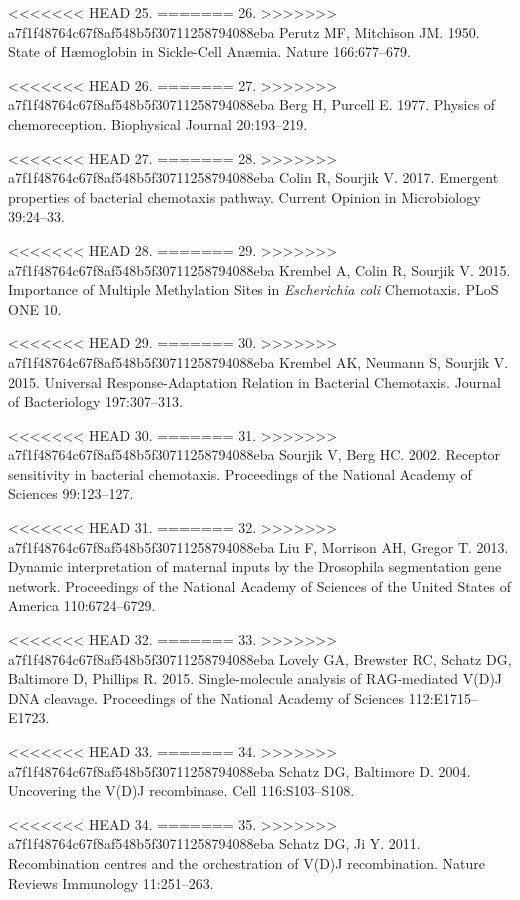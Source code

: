 \hypertarget{ref-perutz1950}{}
<<<<<<< HEAD
25.
=======
26.
>>>>>>> a7f1f48764c67f8af548b5f30711258794088eba
Perutz
MF,
Mitchison
JM.
1950.
State
of
Hæmoglobin
in
Sickle-Cell
Anæmia.
Nature
166:677--679.

\hypertarget{ref-berg1977}{}
<<<<<<< HEAD
26.
=======
27.
>>>>>>> a7f1f48764c67f8af548b5f30711258794088eba
Berg
H,
Purcell
E.
1977.
Physics
of
chemoreception.
Biophysical
Journal
20:193--219.

\hypertarget{ref-colin2017}{}
<<<<<<< HEAD
27.
=======
28.
>>>>>>> a7f1f48764c67f8af548b5f30711258794088eba
Colin
R,
Sourjik
V.
2017.
Emergent
properties
of
bacterial
chemotaxis
pathway.
Current
Opinion
in
Microbiology
39:24--33.

\hypertarget{ref-krembel2015a}{}
<<<<<<< HEAD
28.
=======
29.
>>>>>>> a7f1f48764c67f8af548b5f30711258794088eba
Krembel
A,
Colin
R,
Sourjik
V.
2015.
Importance
of
Multiple
Methylation
Sites
in
\emph{Escherichia
coli}
Chemotaxis.
PLoS
ONE
10.

\hypertarget{ref-krembel2015}{}
<<<<<<< HEAD
29.
=======
30.
>>>>>>> a7f1f48764c67f8af548b5f30711258794088eba
Krembel
AK,
Neumann
S,
Sourjik
V.
2015.
Universal
Response-Adaptation
Relation
in
Bacterial
Chemotaxis.
Journal
of
Bacteriology
197:307--313.

\hypertarget{ref-sourjik2002}{}
<<<<<<< HEAD
30.
=======
31.
>>>>>>> a7f1f48764c67f8af548b5f30711258794088eba
Sourjik
V,
Berg
HC.
2002.
Receptor
sensitivity
in
bacterial
chemotaxis.
Proceedings
of the
National
Academy
of
Sciences
99:123--127.

\hypertarget{ref-liu2013}{}
<<<<<<< HEAD
31.
=======
32.
>>>>>>> a7f1f48764c67f8af548b5f30711258794088eba
Liu F,
Morrison
AH,
Gregor
T.
2013.
Dynamic
interpretation
of
maternal
inputs
by the
Drosophila
segmentation
gene
network.
Proceedings
of the
National
Academy
of
Sciences
of the
United
States
of
America
110:6724--6729.

\hypertarget{ref-lovely2015}{}
<<<<<<< HEAD
32.
=======
33.
>>>>>>> a7f1f48764c67f8af548b5f30711258794088eba
Lovely
GA,
Brewster
RC,
Schatz
DG,
Baltimore
D,
Phillips
R.
2015.
Single-molecule
analysis
of
RAG-mediated
V(D)J
DNA
cleavage.
Proceedings
of the
National
Academy
of
Sciences
112:E1715--E1723.

\hypertarget{ref-schatz2004}{}
<<<<<<< HEAD
33.
=======
34.
>>>>>>> a7f1f48764c67f8af548b5f30711258794088eba
Schatz
DG,
Baltimore
D.
2004.
Uncovering
the
V(D)J
recombinase.
Cell
116:S103--S108.

\hypertarget{ref-schatz2011}{}
<<<<<<< HEAD
34.
=======
35.
>>>>>>> a7f1f48764c67f8af548b5f30711258794088eba
Schatz
DG, Ji
Y.
2011.
Recombination
centres
and
the
orchestration
of
V(D)J
recombination.
Nature
Reviews
Immunology
11:251--263.


